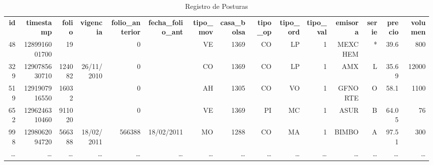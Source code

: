 \documentclass[10pt]{article}
\begin{document}
\begin{landscape}
\begin{table}[htbp]\scriptsize
  \centering
  \caption{ Registro de Posturas}
 \setlength\tabcolsep{1.5pt}
  \begin{tabular}{rrrrrrrrrrrrrrr}
   \textbf{ id}    & \textbf{timestamp} & \textbf{folio} & \textbf{vigencia} & \textbf{folio\_anterior} & \textbf{fecha\_folio\_ant} & \textbf{tipo\_mov} & \textbf{casa\_bolsa} & \textbf{tipo\_op} & \textbf{tipo\_ord} & \textbf{tipo\_val} & \textbf{emisora} & \textbf{serie} & \textbf{precio} & \textbf{volumen} \\
    48 & 1289916001700 & 19    &       & 0     &       & VE    & 1369  & CO    & LP    & 1     & MEXCHEM & *     & 39.6  & 800 \\
    329 & 1290785630710 & 124082 & 26/11/2010 & 0     &       & CO    & 1369  & CO    & LP    & 1     & AMX   & L     & 35.69 & 12000 \\
    519 & 1291907916550 & 16032 &       & 0     &       & AH    & 1305  & CO    & VO    & 1     & GFNORTE & O     & 58.1  & 1100 \\
    652 & 1296246310460 & 911020 &       & 0     &       & VE    & 1369  & PI    & MC    & 1     & ASUR  & B     & 64.05 & 76 \\
    998 & 1298062094720 & 566388 & 18/02/2011 & 566388 & 18/02/2011 & MO    & 1288  & CO    & MA    & 1     & BIMBO & A     & 97.51 & 300 \\
    \ldots & \ldots & \ldots & \ldots & \ldots & \ldots & \ldots & \ldots & \ldots & \ldots & \ldots & \ldots & \ldots & \ldots & \ldots \\
    \end{tabular}%
  \label{tab:regposturasl}%
\end{table}%

\end{landscape}

\newpage

\listoftables
\newpage

\nocite{*}



\end{document}
